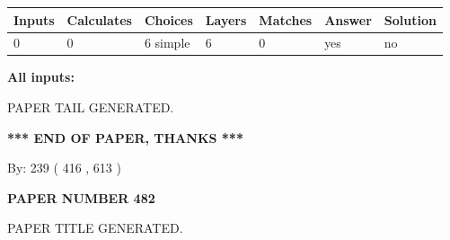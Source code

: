 \documentclass[12pt]{article}
\begin{document}
   
   
   
\noindent\begin{tabular}{|l|l|l|l|l|l|l|}
 \hline
Inputs & Calculates & Choices & Layers & Matches & Answer & Solution \\ \hline
 0  & 
 0  & 
 6
  simple  
  & 
 6  & 
 0  & 
  yes & 
  no 
  \\ \hline
 \end{tabular}
   
   
   
   
\noindent{}
   
   
   
   
\noindent\vspace{0.1in}\hspace{-0.08in} {\textbf{\Large{All inputs: }}}
   
   
   
   
   
   
 \vspace{0.2in}
 
   
   
\vspace{2.0in} PAPER TAIL GENERATED.
   
   
   
   
\vspace{1.0in} 
{\textbf{\large{ *** END OF PAPER, THANKS *** }}} 
   
   
\hspace{1.0in} By: 
 239 ( 416 ,  613 )
   
   
   
   
\newpage 
\setcounter{page}{ 
   482001 } 
   
   
   
   
 {\textbf{ \Large{ PAPER NUMBER  482  }}}
   
   
\vspace{0.2in}
   
   
   
   
   
   
   
   
 \vspace{0.2in}
 
 
 
 
   
   
 PAPER TITLE GENERATED.
   
   
   
\end{document}

